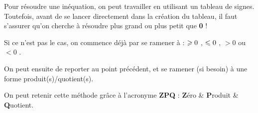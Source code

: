 \documentclass[a4paper,11pt]{article}
\begin{document}
\begin{crappel}[s]
Pour résoudre une inéquation, on peut travailler en utilisant un tableau de signes. Toutefois, avant de se lancer directement dans la création du tableau, il faut s'assurer qu'on cherche à résoudre \og plus grand ou plus petit que \textbf{0} ! \fg{}

\smallskip

Si ce n'est pas le cas, on commence déjà par se ramener à : \og $\geqslant 0$ \fg, \og $\leqslant 0$ \fg, \og $> 0$ \fg ou \og $< 0$ \fg.

\smallskip

On peut ensuite de reporter au point précédent, et se ramener (si besoin) à une forme produit(s)/quotient(s).

\medskip

\hfill\textsf{On peut retenir cette méthode grâce à l'acronyme \textbf{ZPQ} : \textbf{Z}éro \& \textbf{P}roduit \& \textbf{Q}uotient.}\hfill~
\end{crappel}
\end{document}
